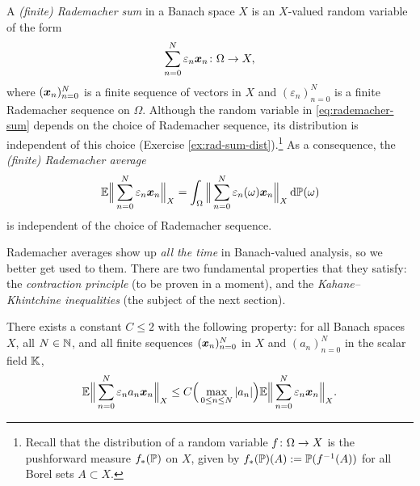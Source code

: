 A \emph{(finite) Rademacher sum} in a Banach space $X$ is an $X$-valued random variable of the form
\begin{equation}\label{eq:rademacher-sum}
  \sum_{n = 0}^{N} \varepsilon_n \mb{x}_{n} \colon \Omega \to X,
\end{equation}
where $(\mb{x}_{n})_{n = 0}^{N}$ is a finite sequence of vectors in $X$ and $(\varepsilon_{n})_{n = 0}^{N}$ is a finite Rademacher sequence on $\Omega$.
Although the random variable in \eqref{eq:rademacher-sum} depends on the choice of Rademacher sequence, its distribution is independent of this choice (Exercise \ref{ex:rad-sum-dist}).\footnote{Recall that the distribution of a random variable $\map{f}{\Omega}{X}$ is the pushforward measure $f_{*}(\P)$ on $X$, given by $f_{*}(\P)(A) := \P(f^{-1}(A))$ for all Borel sets $A \subset X$.}
As a consequence, the \emph{(finite) Rademacher average}
\begin{equation*}
  \E \Big\| \sum_{n = 0}^{N} \varepsilon_{n} \mb{x}_{n} \Big\|_{X} = \int_{\Omega}  \Big\| \sum_{n = 0}^{N} \varepsilon_{n}(\omega) \mb{x}_{n} \Big\|_{X} \, \dd\P(\omega)
\end{equation*}
is independent of the choice of Rademacher sequence.

Rademacher averages show up \emph{all the time} in Banach-valued analysis, so we better get used to them.
There are two fundamental properties that they satisfy: the \emph{contraction principle} (to be proven in a moment), and the \emph{Kahane--Khintchine inequalities} (the subject of the next section).

\begin{thm}\label{thm:contraction}
  There exists a constant $C \leq 2$ with the following property: for all Banach spaces $X$, all $N \in \N$, and all finite sequences $(\mb{x}_{n})_{n = 0}^{N}$ in $X$ and $(a_{n})_{n=0}^{N}$ in the scalar field $\K$,
  \begin{equation*}
    \E \Big\| \sum_{n = 0}^{N} \varepsilon_{n} a_{n} \mb{x}_{n} \Big\|_{X} \leq C \Big( \max_{0 \leq n \leq N} |a_{n}| \Big) \E \Big\| \sum_{n = 0}^{N} \varepsilon_{n} \mb{x}_{n} \Big\|_{X}.
  \end{equation*}
\end{thm}

